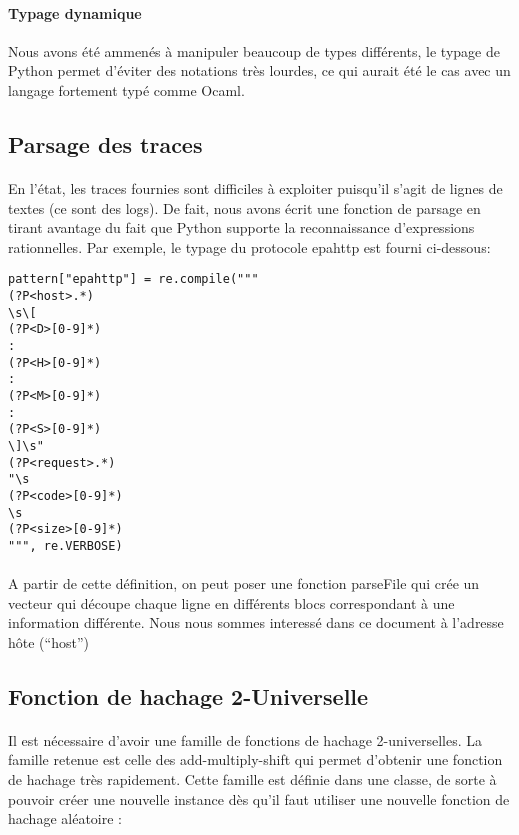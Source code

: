 \documentclass[a4paper,11pt]{article}%
\begin{document}
\paragraph{Typage dynamique}Nous avons été ammenés à manipuler beaucoup de types différents, le typage de Python permet d'éviter des notations très lourdes, ce qui aurait été le cas avec un langage fortement typé comme Ocaml.

\subsection{Parsage des traces}

\paragraph{}En l'état, les traces fournies sont difficiles à exploiter puisqu'il s'agit de lignes de textes (ce sont des logs). De fait, nous avons écrit une fonction de parsage en tirant avantage du fait que Python supporte la reconnaissance d'expressions rationnelles. Par exemple, le typage du protocole epahttp est fourni ci-dessous:

\begin{lstlisting}
pattern["epahttp"] = re.compile("""
(?P<host>.*)
\s\[
(?P<D>[0-9]*)
:
(?P<H>[0-9]*)
:
(?P<M>[0-9]*)
:
(?P<S>[0-9]*)
\]\s"
(?P<request>.*)
"\s
(?P<code>[0-9]*)
\s
(?P<size>[0-9]*)
""", re.VERBOSE)
\end{lstlisting}

\paragraph{}A partir de cette définition, on peut poser une fonction parseFile qui crée un vecteur qui découpe chaque ligne en différents blocs correspondant à une information différente. Nous nous sommes interessé dans ce document à l'adresse hôte (``host'')

\subsection{Fonction de hachage 2-Universelle}

\paragraph{}Il est nécessaire d'avoir une famille de fonctions de hachage 2-universelles. La famille retenue est celle des add-multiply-shift qui permet d'obtenir une fonction de hachage très rapidement.\newline
Cette famille est définie dans une classe, de sorte à pouvoir créer une nouvelle instance dès qu'il faut utiliser une nouvelle fonction de hachage aléatoire :
\end{document}
